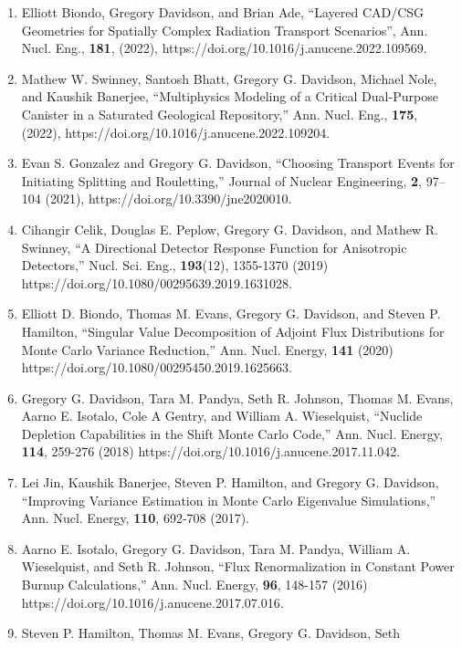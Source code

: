 \documentclass[letterpaper,11pt]{article}
\begin{document}
\begin{enumerate}
  \item Elliott Biondo, Gregory Davidson, and Brian Ade, ``Layered CAD/CSG 
    Geometries for Spatially Complex Radiation Transport Scenarios'', Ann. Nucl. 
    Eng., \textbf{181}, (2022), https://doi.org/10.1016/j.anucene.2022.109569.
  \item Mathew W. Swinney, Santosh Bhatt, Gregory G. Davidson, Michael Nole, and
    Kaushik Banerjee, ``Multiphysics Modeling of a Critical Dual-Purpose
    Canister in a Saturated Geological Repository,'' Ann. Nucl. Eng., 
    \textbf{175}, (2022), https://doi.org/10.1016/j.anucene.2022.109204.  
  \item Evan S. Gonzalez and Gregory G. Davidson, ``Choosing Transport
    Events for Initiating Splitting and Rouletting,'' Journal of
    Nuclear Engineering, \textbf{2}, 97--104 (2021),
    https://doi.org/10.3390/jne2020010.
  \item Cihangir Celik, Douglas E. Peplow, Gregory G. Davidson, and
    Mathew R. Swinney, ``A Directional Detector Response Function for
    Anisotropic Detectors,'' Nucl. Sci. Eng., \textbf{193}(12),
    1355-1370 (2019) https://doi.org/10.1080/00295639.2019.1631028.
  \item Elliott D. Biondo, Thomas M. Evans, Gregory G. Davidson, and
    Steven P. Hamilton, ``Singular Value Decomposition of Adjoint Flux
    Distributions for Monte Carlo Variance Reduction,''
    Ann. Nucl. Energy, \textbf{141} (2020)
    https://doi.org/10.1080/00295450.2019.1625663. 
  \item Gregory G. Davidson, Tara M. Pandya, Seth R. Johnson, Thomas
    M. Evans, Aarno E. Isotalo, Cole A Gentry, and William
    A. Wieselquist, ``Nuclide Depletion Capabilities in the Shift Monte
    Carlo Code,'' Ann. Nucl. Energy, \textbf{114}, 259-276 (2018)
    https://doi.org/10.1016/j.anucene.2017.11.042.
  \item Lei Jin, Kaushik Banerjee, Steven P. Hamilton, and Gregory
    G. Davidson, ``Improving Variance Estimation in Monte Carlo
    Eigenvalue Simulations,'' Ann. Nucl. Energy, \textbf{110}, 692-708
    (2017). 
  \item Aarno E. Isotalo, Gregory G. Davidson, Tara M. Pandya, William
    A. Wieselquist, and Seth R. Johnson, ``Flux Renormalization in
    Constant Power Burnup Calculations,'' Ann. Nucl. Energy,
    \textbf{96}, 148-157 (2016)
    https://doi.org/10.1016/j.anucene.2017.07.016.
  \item Steven P. Hamilton, Thomas M. Evans, Gregory G. Davidson, Seth

\end{enumerate}
\end{document}
